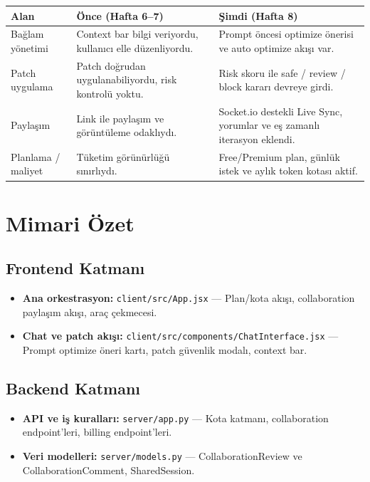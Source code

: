 \documentclass[11pt,a4paper]{article}
\begin{document}
\begin{tabularx}{\textwidth}{@{} L{2.8cm} X X @{}}
\toprule
\textbf{Alan} & \textbf{Önce (Hafta 6--7)} & \textbf{Şimdi (Hafta 8)} \\
\midrule
Bağlam yönetimi & Context bar bilgi veriyordu, kullanıcı elle düzenliyordu. & Prompt öncesi optimize önerisi ve auto optimize akışı var. \\
\addlinespace
Patch uygulama & Patch doğrudan uygulanabiliyordu, risk kontrolü yoktu. & Risk skoru ile safe / review / block kararı devreye girdi. \\
\addlinespace
Paylaşım & Link ile paylaşım ve görüntüleme odaklıydı. & Socket.io destekli Live Sync, yorumlar ve eş zamanlı iterasyon eklendi. \\
\addlinespace
Planlama / maliyet & Tüketim görünürlüğü sınırlıydı. & Free/Premium plan, günlük istek ve aylık token kotası aktif. \\
\bottomrule
\end{tabularx}

\section{Mimari Özet}

\subsection{Frontend Katmanı}
\begin{itemize}[leftmargin=1.5em]
  \item \textbf{Ana orkestrasyon:} \texttt{client/src/App.jsx} — Plan/kota akışı, collaboration paylaşım akışı, araç çekmecesi.
  \item \textbf{Chat ve patch akışı:} \texttt{client/src/components/ChatInterface.jsx} — Prompt optimize öneri kartı, patch güvenlik modalı, context bar.
\end{itemize}

\subsection{Backend Katmanı}
\begin{itemize}[leftmargin=1.5em]
  \item \textbf{API ve iş kuralları:} \texttt{server/app.py} — Kota katmanı, collaboration endpoint'leri, billing endpoint'leri.
  \item \textbf{Veri modelleri:} \texttt{server/models.py} — CollaborationReview ve CollaborationComment, SharedSession.
\end{itemize}
\end{document}
